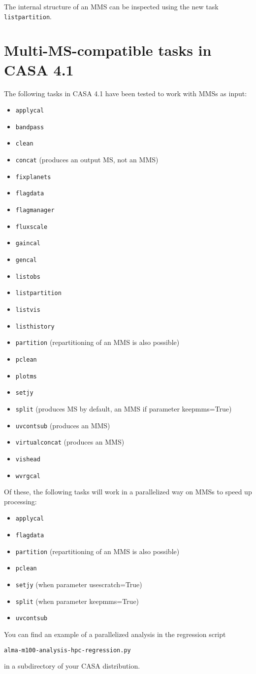 The internal structure of an MMS can be inspected using the new task {\tt listpartition}.

\section{Multi-MS-compatible tasks in CASA 4.1}

The following tasks in CASA 4.1 have been tested to work with MMSs as input:
\begin{itemize}
\item {\tt applycal}
\item {\tt bandpass}
\item {\tt clean}
\item {\tt concat} (produces an output MS, not an MMS)
\item {\tt fixplanets}
\item {\tt flagdata}
\item {\tt flagmanager}
\item {\tt fluxscale}
\item {\tt gaincal}
\item {\tt gencal}
\item {\tt listobs}
\item {\tt listpartition}
\item {\tt listvis}
\item {\tt listhistory}
\item {\tt partition} (repartitioning of an MMS is also possible)
\item {\tt pclean}
\item {\tt plotms}
\item {\tt setjy}
\item {\tt split} (produces MS by default, an MMS if parameter keepmms=True)
\item {\tt uvcontsub} (produces an MMS)
\item {\tt virtualconcat} (produces an MMS)
\item {\tt vishead}
\item {\tt wvrgcal}
\end{itemize}
Of these, the following tasks will work in a parallelized way on MMSs
to speed up processing:
\begin{itemize}
\item {\tt applycal}
\item {\tt flagdata}
\item {\tt partition} (repartitioning of an MMS is also possible)
\item {\tt pclean}
\item {\tt setjy} (when parameter usescratch=True)
\item {\tt split} (when parameter keepmms=True)
\item {\tt uvcontsub}
\end{itemize}
You can find an example of a parallelized analysis in the regression script
\begin{center}
{\tt alma-m100-analysis-hpc-regression.py} 
\end{center}
in a subdirectory of your CASA distribution.

